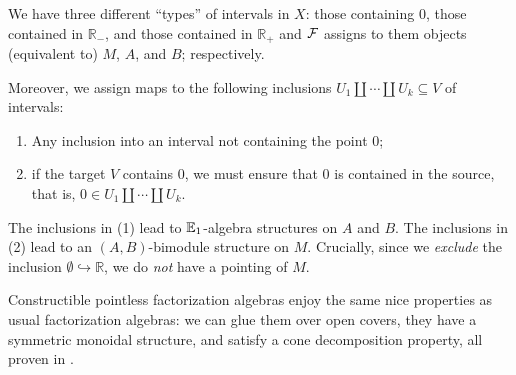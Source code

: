 \documentclass[10pt, reqno, twoside
, final
]{amsart}
\numberwithin{equation}{subsection}%
\theoremstyle{definition}
\theoremstyle{definition}
\theoremstyle{definition}
\theoremstyle{definition}
\theoremstyle{definition}
\theoremstyle{definition}
\theoremstyle{definition}
\theoremstyle{definition}
\theoremstyle{definition}
\theoremstyle{plain}
\theoremstyle{definition}
\theoremstyle{plain}
\theoremstyle{definition}
\theoremstyle{plain}
\theoremstyle{definition}
\theoremstyle{definition}
\theoremstyle{plain}
\theoremstyle{plain}
\theoremstyle{definition}
\theoremstyle{plain}
\theoremstyle{plain}
\theoremstyle{plain}
\begin{document}
We have three different ``types'' of intervals in $X$: those containing 0, those contained in $\mathbb{R}_{-}$, and those contained in $\mathbb{R}_{+}$ and $\mathcal{F}$ assigns to them objects (equivalent to) $M$,  $A$, and $B$; respectively.
\begin{center}
\end{center}
Moreover, we assign maps to the following inclusions $U_1\amalg \cdots \amalg U_k \subseteq V$ of intervals:
\begin{enumerate}
    \item Any inclusion into an interval not containing the point 0;
    \item if the target $V$ contains 0, we must ensure that 0 is contained in the source, that is, $0\in U_1\amalg \cdots \amalg U_k$.
\end{enumerate}


The inclusions in (1) lead to $\mathbb{E}_1$-algebra structures on $A$ and $B$. The inclusions in (2) lead to an $(A,B)$-bimodule structure on $M$. Crucially, since we {\em exclude} the inclusion $\emptyset \hookrightarrow \mathbb{R}$, we do {\em not} have a pointing of $M$.


Constructible pointless factorization algebras enjoy the same nice properties as usual factorization algebras: we can glue them over open covers, they have a symmetric monoidal structure, and satisfy a cone decomposition property, all proven in \cite{KS}.
\end{document}
